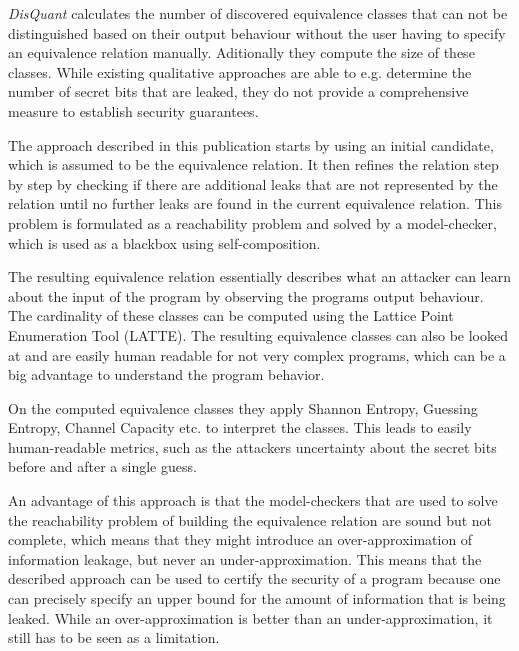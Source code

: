 \documentclass[a4paper,UKenglish]{lipics-v2018}
\begin{document}
\textit{DisQuant} calculates the number of discovered equivalence classes that can not be distinguished based on their output behaviour without the user having to specify an equivalence relation manually. Aditionally they compute the size of these classes. While existing qualitative approaches are able to e.g. determine the number of secret bits that are leaked, they do not provide a comprehensive measure to establish security guarantees.\cite{automatic_discovery_and_quantification}

The approach described in this publication starts by using an initial candidate, which is assumed to be the equivalence relation. It then refines the relation step by step by checking if there are additional leaks that are not represented by the relation until no further leaks are found in the current equivalence relation. This problem is formulated as a reachability problem and solved by a model-checker, which is used as a blackbox using self-composition.\cite{automatic_discovery_and_quantification}

The resulting equivalence relation essentially describes what an attacker can learn about the input of the program by observing the programs output behaviour. The cardinality of these classes can be computed using the Lattice Point Enumeration Tool (LATTE). The resulting equivalence classes can also be looked at and are easily human readable for not very complex programs, which can be a big advantage to understand the program behavior.
\cite{automatic_discovery_and_quantification}

On the computed equivalence classes they apply Shannon Entropy, Guessing Entropy, Channel Capacity etc. to interpret the classes. This leads to easily human-readable metrics, such as the attackers uncertainty about the secret bits before and after a single guess.\cite{automatic_discovery_and_quantification}

An advantage of this approach is that the model-checkers that are used to solve the reachability problem of building the equivalence relation are sound but not complete, which means that they might introduce an over-approximation of information leakage, but never an under-approximation. This means that the described approach can be used to certify the security of a program because one can precisely specify an upper bound for the amount of information that is being leaked.\cite{automatic_discovery_and_quantification} While an over-approximation is better than an under-approximation, it still has to be seen as a limitation.
\end{document}
